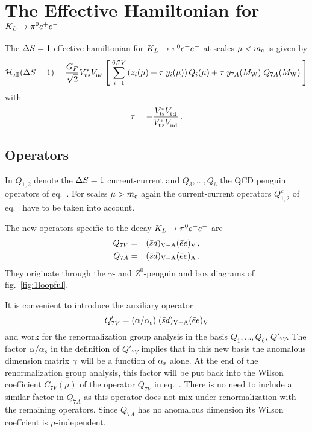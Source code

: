 \section{The Effective Hamiltonian for $K_L \to \pi^0 e^+ e^-$}
         \label{sec:HeffKpe}
The $\Delta S=1$ effective hamiltonian for $K_L \to \pi^0 e^+ e^-$ at scales $\mu < m_{\rm c}$ is given by
\begin{equation}
{\cal H}_{\rm eff}(\Delta S=1) = \frac{G_F}{\sqrt{2}} V_{\rm us}^* V_{\rm ud}^{} \left[ \; \sum_{i=1}^{6,7V}
             \left( z_i(\mu) + \tau \; y_i(\mu) \right) Q_i(\mu)
             + \tau \; y_{7A}(M_{\rm W}) \; Q_{7A}(M_{\rm W}) \; \right]
\label{eq:HeffKpe}
\end{equation}
with
\begin{equation}
\tau = - \frac{ V_{\rm ts}^* V_{\rm td}^{} }{ V_{\rm us}^* V_{\rm ud}^{} } \, .
\label{eq:tauagain}
\end{equation}

\subsection{Operators}
            \label{sec:HeffKpe:op}
In  $Q_{1,2}$
denote the $\Delta S=1$ current-current and $Q_3,\ldots,Q_6$ the QCD penguin
operators of eq.~. For scales $\mu > m_{\rm c}$ again the
current-current operators $Q^c_{1,2}$ of eq.~ have to
be taken into account.

The new operators specific to the decay $K_L \to \pi^0 e^+ e^-$ are
\begin{eqnarray}
Q_{7V} &=& (\bar{s} d)_{\rm V-A} (\bar{e} e)_{\rm V} \, ,
\label{eq:Q7VKpe} \\
Q_{7A} &=& (\bar{s} d)_{\rm V-A} (\bar{e} e)_{\rm A} \, .
\label{eq:Q7AKpe}
\end{eqnarray}
They originate through the $\gamma$- and $Z^0$-penguin and box diagrams of
fig.\ \ref{fig:1loopful}.

It is convenient to introduce the auxiliary operator
\begin{equation}
Q'_{7V} = (\alpha/\alpha_{\rm s}) \; (\bar{s} d)_{\rm V-A} (\bar{e}e)_{\rm V}
\label{eq:Q7VprimeKpe}
\end{equation}
and work for the renormalization group analysis in the basis
$Q_1,\ldots,Q_6$, $Q'_{7V}$. The factor $\alpha/\alpha_{\rm s}$ in the definition of
$Q'_{7V}$ implies that in this new basis the anomalous
dimension matrix $\gamma$ will be a function of $\alpha_{\rm s}$ alone. At the end of the
renormalization group analysis, this factor will be put back into the
Wilson coefficient $C_{7V}(\mu)$ of the operator $Q_{7V}$ in
eq.~. There is no need to include a similar factor in
$Q_{7A}$ as this operator does not mix under renormalization with the
remaining operators. Since $Q_{7A}$ has no anomalous dimension its Wilson
coeffcient is $\mu$-independent.


